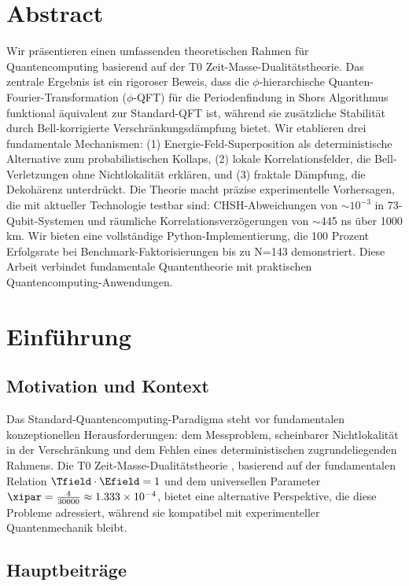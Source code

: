 \section*{Abstract}
Wir präsentieren einen umfassenden theoretischen Rahmen für Quantencomputing basierend auf der T0 Zeit-Masse-Dualitätstheorie. Das zentrale Ergebnis ist ein rigoroser Beweis, dass die $\phi$-hierarchische Quanten-Fourier-Transformation ($\phi$-QFT) für die Periodenfindung in Shors Algorithmus funktional äquivalent zur Standard-QFT ist, während sie zusätzliche Stabilität durch Bell-korrigierte Verschränkungsdämpfung bietet. Wir etablieren drei fundamentale Mechanismen: (1) Energie-Feld-Superposition als deterministische Alternative zum probabilistischen Kollaps, (2) lokale Korrelationsfelder, die Bell-Verletzungen ohne Nichtlokalität erklären, und (3) fraktale Dämpfung, die Dekohärenz unterdrückt. Die Theorie macht präzise experimentelle Vorhersagen, die mit aktueller Technologie testbar sind: CHSH-Abweichungen von $\sim 10^{-3}$ in 73-Qubit-Systemen und räumliche Korrelationsverzögerungen von $\sim$445 ns über 1000 km. Wir bieten eine vollständige Python-Implementierung, die 100 Prozent Erfolgsrate bei Benchmark-Faktorisierungen bis zu N=143 demonstriert. Diese Arbeit verbindet fundamentale Quantentheorie mit praktischen Quantencomputing-Anwendungen.


\clearpage

\section{Einführung}

\subsection{Motivation und Kontext}

Das Standard-Quantencomputing-Paradigma steht vor fundamentalen konzeptionellen Herausforderungen: dem Messproblem, scheinbarer Nichtlokalität in der Verschränkung und dem Fehlen eines deterministischen zugrundeliegenden Rahmens. Die T0 Zeit-Masse-Dualitätstheorie \cite{pascher_t0_2025}, basierend auf der fundamentalen Relation $\Tfield \cdot \Efield = 1$ und dem universellen Parameter $\xipar = \frac{4}{30000} \approx 1.333 \times 10^{-4}$, bietet eine alternative Perspektive, die diese Probleme adressiert, während sie kompatibel mit experimenteller Quantenmechanik bleibt.

\subsection{Hauptbeiträge}


